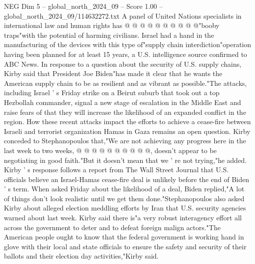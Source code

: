 \begin{textsample}{NEG Dim 5 – global\_north\_2024\_09 – Score 1.00 – global\_north\_2024\_09/114632272.txt}
A panel of United Nations specialists in international law and human rights has @ @ @ @ @ @ @ @ @ @"booby traps"with the potential of harming civilians.
Israel had a hand in the manufacturing of the devices with this type of"supply chain interdiction"operation having been planned for at least 15 years, a U.S. intelligence source confirmed to ABC News.
In response to a question about the security of U.S. supply chains, Kirby said that President Joe Biden"has made it clear that he wants the American supply chain to be as resilient and as vibrant as possible."The attacks, including Israel ' s Friday strike on a Beirut suburb that took out a top Hezbollah commander, signal a new stage of escalation in the Middle East and raise fears of that they will increase the likelihood of an expanded conflict in the region.
How these recent attacks impact the efforts to achieve a cease-fire between Israeli and terrorist organization Hamas in Gaza remains an open question.
Kirby conceded to Stephanopoulos that,"We are not achieving any progress here in the last week to two weeks, @ @ @ @ @ @ @ @ @ @, doesn't appear to be negotiating in good faith."But it doesn't mean that we ' re not trying,"he added.
Kirby ' s response follows a report from The Wall Street Journal that U.S. officials believe an Israel-Hamas cease-fire deal is unlikely before the end of Biden ' s term.
When asked Friday about the likelihood of a deal, Biden replied,"A lot of things don't look realistic until we get them done."Stephanopoulos also asked Kirby about alleged election meddling efforts by Iran that U.S. security agencies warned about last week.
Kirby said there is"a very robust interagency effort all across the government to deter and to defeat foreign malign actors."The American people ought to know that the federal government is working hand in glove with their local and state officials to ensure the safety and security of their ballots and their election day activities,"Kirby said.

\end{textsample}

